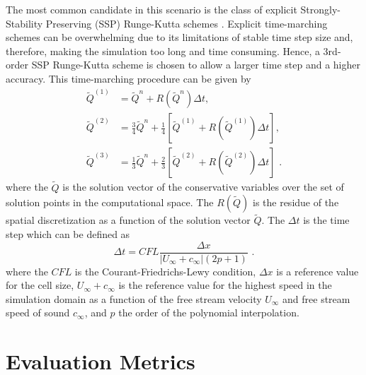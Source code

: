 The most common candidate in this scenario is the class of explicit Strongly-Stability Preserving (SSP) Runge-Kutta schemes \cite{Gottlieb2018strong, Spiteri2002}. Explicit time-marching schemes can be overwhelming due to its limitations of stable time step size and, therefore, making the simulation too long and time consuming. Hence, a 3rd-order SSP Runge-Kutta scheme is chosen to allow a larger time step and a higher accuracy. This time-marching procedure can be given by
%
\begin{align}
    \label{eq_ssp_rk}
    \tilde{Q}^{(1)} &= \tilde{Q}^{n} + R(\tilde{Q}^{n}) \Delta t, \\
    \tilde{Q}^{(2)} &= \frac{3}{4}\tilde{Q}^{n} + \frac{1}{4}[\tilde{Q}^{(1)} + R(\tilde{Q}^{(1)})\Delta t], \\
    \tilde{Q}^{(3)} &= \frac{1}{3}\tilde{Q}^{n} + \frac{2}{3}[\tilde{Q}^{(2)} + R(\tilde{Q}^{(2)})\Delta t]
    \mbox{ .}
\end{align}
where the $\tilde{Q}$ is the solution vector of the conservative variables over the set of solution points in the computational space. The $R(\tilde{Q})$ is the residue of the spatial discretization as a function of the solution vector $\tilde{Q}$. The $\Delta t$ is the time step which can be defined as
%
\begin{equation}
    \label{eq_ssp_rk_time_step}
	\Delta t = CFL \frac{\Delta x}{|U_{\infty} + c_{\infty}|(2p+1)}
    \mbox{ .}
\end{equation}
where the $CFL$ is the Courant-Friedrichs-Lewy condition, $\Delta x$ is a reference value for the cell size, $U_{\infty} + c_{\infty}$ is the reference value for the highest speed in the simulation domain as a function of the free stream velocity $U_{\infty}$ and free stream speed of sound $c_{\infty}$, and $p$ the order of the polynomial interpolation.


\section{Evaluation Metrics}
